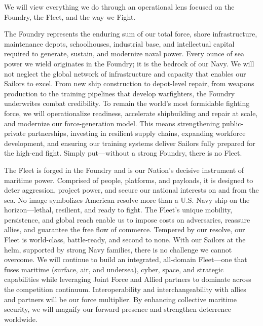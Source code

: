 \documentclass[../main.tex]{subfiles}
\begin{document}
\begin{description}[style=nextline, labelsep=0.5em, font=\bfseries]
  \item[\textbf{Priorities.}] We will view everything we do through an operational lens focused on the Foundry, the Fleet, and the way we Fight.
  \begin{description}[style=nextline, labelsep=0.5em, font=\bfseries]
    \item[\textbf{Foundry.}] The Foundry represents the enduring sum of our total force, shore infrastructure, maintenance depots, schoolhouses, industrial base, and intellectual capital required to generate, sustain, and modernize naval power. Every ounce of sea power we wield originates in the Foundry; it is the bedrock of our Navy. We will not neglect the global network of infrastructure and capacity that enables our Sailors to excel. From new ship construction to depot-level repair, from weapons production to the training pipelines that develop warfighters, the Foundry underwrites combat credibility. To remain the world's most formidable fighting force, we will operationalize readiness, accelerate shipbuilding and repair at scale, and modernize our force-generation model. This means strengthening public-private partnerships, investing in resilient supply chains, expanding workforce development, and ensuring our training systems deliver Sailors fully prepared for the high-end fight. Simply put---without a strong Foundry, there is no Fleet.

    \item[\textbf{Fleet.}] The Fleet is forged in the Foundry and is our Nation's decisive instrument of maritime power. Comprised of people, platforms, and payloads, it is designed to deter aggression, project power, and secure our national interests on and from the sea. No image symbolizes American resolve more than a U.S. Navy ship on the horizon---lethal, resilient, and ready to fight. The Fleet's unique mobility, persistence, and global reach enable us to impose costs on adversaries, reassure allies, and guarantee the free flow of commerce. Tempered by our resolve, our Fleet is world-class, battle-ready, and second to none. With our Sailors at the helm, supported by strong Navy families, there is no challenge we cannot overcome. We will continue to build an integrated, all-domain Fleet---one that fuses maritime (surface, air, and undersea), cyber, space, and strategic capabilities while leveraging Joint Force and Allied partners to dominate across the competition continuum. Interoperability and interchangeability with allies and partners will be our force multiplier. By enhancing collective maritime security, we will magnify our forward presence and strengthen deterrence worldwide.


\end{description}
\end{description}
\end{document}
